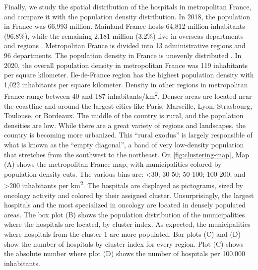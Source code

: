 Finally, we study the spatial distribution of the hospitals in metropolitan
France, and compare it with the population density distribution. In 2018, the
population in France was 66,993 million. Mainland France hosts 64,812 million
inhabitants (96.8\%), while the remaining 2,181 million (3.2\%) live in overseas
departments and regions . Metropolitan France is divided into 13 administrative
regions and 96 departments. The population density in France is unevenly
distributed . In 2020, the overall population density in metropolitan France was
119 inhabitants per square kilometer. Ile-de-France region has the highest
population density with 1,022 inhabitants per square kilometer. Density in other
regions in metropolitan France range between 40 and 187
inhabitants/km\textsuperscript{2}. Denser areas are located near the coastline
and around the largest cities like Paris, Marseille, Lyon, Strasbourg, Toulouse,
or Bordeaux. The middle of the country is rural, and the population densities
are low. While there are a great variety of regions and landscapes, the country
is becoming more urbanized. This ``rural exodus'' is largely responsible of what
is known as the ``empty diagonal'', a band of very low-density population that
stretches from the southwest to the northeast. On \cref{fig:clustering-map}, Map
(A) shows the metropolitan France map, with municipalities colored by population
density cuts. The various bins are: <30; 30-50; 50-100; 100-200; and >200
inhabitants per km\textsuperscript{2}. The hospitals are displayed as
pictograms, sized by oncology activity and colored by their assigned cluster.
Unsurprisingly, the largest hospitals and the most specialized in oncology are
located in densely populated areas. The box plot (B) shows the population
distribution of the municipalities where the hospitals are located, by cluster
index. As expected, the municipalities where hospitals from the cluster 1 are
more populated. Bar plots (C) and (D) show the number of hospitals by cluster
index for every region. Plot (C) shows the absolute number where plot (D) shows
the number of hospitals per 100,000 inhabitants.

